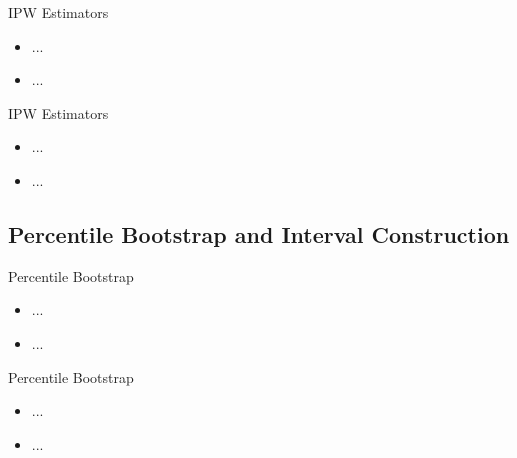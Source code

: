 \documentclass{beamer}
\begin{document}
\begin{frame}{IPW Estimators}

\begin{itemize}
  \itemsep12pt
  \item ...
  \item ...
\end{itemize}

\end{frame}


\begin{frame}{IPW Estimators}

\begin{itemize}
  \itemsep12pt
  \item ...
  \item ...
\end{itemize}

\end{frame}

\subsection{Percentile Bootstrap and Interval Construction}

\begin{frame}{Percentile Bootstrap}

\begin{itemize}
  \itemsep12pt
  \item ...
  \item ...
\end{itemize}

\end{frame}


\begin{frame}{Percentile Bootstrap}

\begin{itemize}
  \itemsep12pt
  \item ...
  \item ...
\end{itemize}

\end{frame}

\end{document}
